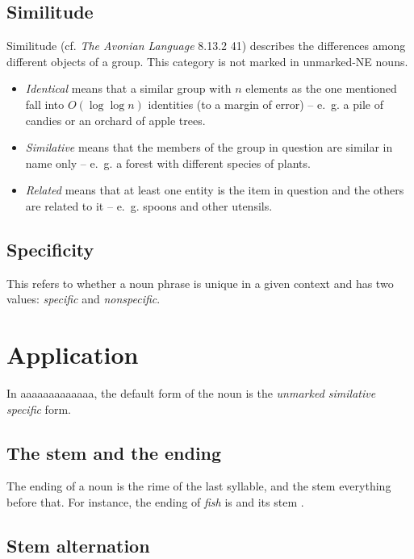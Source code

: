 \documentclass{book}
\newcommand{\lname}{aaaaaaaaaaaaa}
\begin{document}
\subsection{Similitude}

Similitude (cf. \emph{The Avonian Language} 8.13.2 41) describes the differences among different objects of a group. This category is not marked in unmarked-NE nouns.

\begin{itemize}
  \item \emph{Identical} means that a similar group with $n$ elements as the one mentioned fall into $O(\log \log n)$ identities (to a margin of error) -- e.~g. a pile of candies or an orchard of apple trees.
  \item \emph{Similative} means that the members of the group in question are similar in name only -- e.~g. a forest with different species of plants.
  \item \emph{Related} means that at least one entity is the item in question and the others are related to it -- e.~g. spoons and other utensils.
\end{itemize}

\subsection{Specificity}

This refers to whether a noun phrase is unique in a given context and has two values: \emph{specific} and \emph{nonspecific}.

\section{Application}

In \lname{}, the default form of the noun is the \emph{unmarked similative specific} form.


\subsection{The stem and the ending}

The ending of a noun is the rime of the last syllable, and the stem everything before that. For instance, the ending of  \emph{fish} is  and its stem .

\subsection{Stem alternation}
\end{document}
